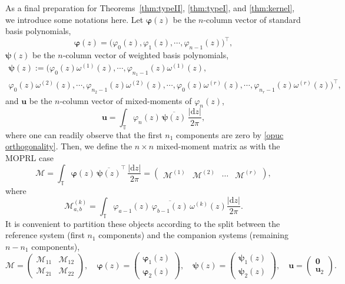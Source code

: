 \documentclass[a4paper,10pt,leqno]{amsart}
\numberwithin{equation}{section}
\theoremstyle{remark}
\newcommand{\dd}{\mathrm{d}}
\newcommand{\TT}{\mathbb{T}}
\newcommand{\red}[1]{{\color{red} #1}}
\begin{document}
As a final preparation for Theorems~\ref{thm:typeII}, \ref{thm:typeI}, and \ref{thm:kernel}, we introduce some notations here.
Let $\bm{\varphi}(z)$ be the $n$-column vector of standard basis polynomials,
\begin{equation}\label{eq:pi-primary}
\boldsymbol{\varphi}(z) = \big( \varphi_0(z),\varphi_1(z),\cdots,\varphi_{n-1}(z) \big)^\top,
\end{equation}
$\boldsymbol{\psi}(z)$ be the $n$-column vector of weighted basis polynomials,
\begin{multline} \label{eq:chi-stacked}
    \boldsymbol{\psi}(z) := \bigg( \varphi_0(z) \omega^{(1)}(z), \cdots, \varphi_{n_1-1}(z) \omega^{(1)}(z),\\ \varphi_0(z) \omega^{(2)}(z), \cdots, \varphi_{n_2-1}(z) \omega^{(2)}(z), \boldsymbol{\cdots}, \varphi_0 (z) \omega^{(r)}(z), \cdots, \varphi_{n_r-1}(z) \omega^{(r)}(z)\bigg)^\top,
\end{multline}
and $\boldsymbol{u}$ be the $n$-column vector of mixed-moments of $\varphi_n(z)$,
\begin{equation}\label{eq:v-def}
\boldsymbol{u} = \int_{\TT} \varphi_n(z) \,\overline{\boldsymbol{\psi}(z)}\, \frac{|\dd z|}{2\pi},
\end{equation}
where one can readily observe that the first $n_1$ components are zero by \eqref{opuc orthogonality}.
Then, we define the $n \times n$ mixed-moment matrix as with the MOPRL case%
\begin{equation}\label{eq:M-def}
\bm{\mathcal{M}} = \int_{\TT} \bm{\varphi}(z) \, \overline{\bm \psi(z)}^\top \, \frac{|\dd z|}{2 \pi} = \begin{pmatrix}
    \mathcal{M}^{(1)} & \mathcal{M}^{(2)} & \cdots & \mathcal{M}^{(r)}
\end{pmatrix},
\end{equation}
where
\[
\mathcal{M}^{(k)}_{a, b} = \int_{\TT} \varphi_{a-1}(z) \, \overline{\varphi_{b-1}(z)} \, \omega^{(k)}(z) \frac{|\dd z|}{2\pi}.
\]
It is convenient to partition these objects according to the split between the reference system (first $n_1$ components) and the companion systems (remaining $n-n_1$ components),
\begin{equation}\label{eq:block-structure}
\bm{\mathcal{M}} = \begin{pmatrix}
\bm{\mathcal{M}}_{11} & \bm{\mathcal{M}}_{12}\\
\bm{\mathcal{M}}_{21} & \bm{\mathcal{M}}_{22}
\end{pmatrix}, \quad
\bm{\varphi}(z) = \begin{pmatrix} 
\bm{\varphi}_1(z)\\ 
\bm{\varphi}_2(z)
\end{pmatrix}, \quad
\bm{\psi}(z) = \begin{pmatrix}
\bm{\psi}_1(z)\\ 
\bm{\psi}_2(z)
\end{pmatrix}, \quad
\bm{u} = \begin{pmatrix}
\bm{0}\\
\bm{u}_2
\end{pmatrix}.
\end{equation}
\end{document}
